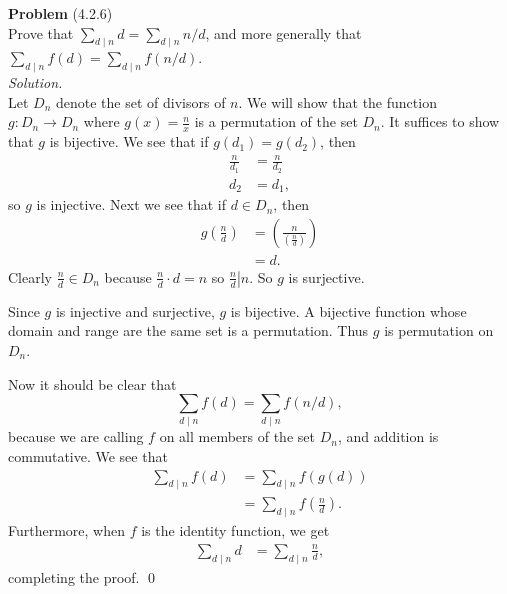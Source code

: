 \documentclass[12 pt]{amsart}
\begin{document}
\phantom{\quad} \vfill
\noindent
\textbf{Problem} (4.2.6) \\[4ex]
  Prove that $\sum_{d \mid n} d = \sum_{d \mid n} n / d$, 
  and more generally that 
  $\sum_{d \mid n} f(d) = \sum_{d \mid n} f(n / d)$.
  \\[2ex]
\emph{Solution.} \\[2ex]
  Let $D_n$ denote the set of divisors of $n$.
  We will show that the function 
  $g: D_n \to D_n$ where
  $g(x) = \frac{n}{x}$ is a permutation of the set $D_n$.
  It suffices to show that $g$ is bijective.
  We see that if $g(d_1) = g(d_2)$, then 
  \begin{align*}
    \frac{n}{d_1} &=  \frac{n}{d_2} \\
    d_2 &= d_1,
  \end{align*}
  so $g$ is injective.
  Next we see that if $d \in D_n$, 
  then 
  \begin{align*}
    g\left( \frac{n}{d} \right) 
    &=
    \left( \frac{n}{\left( \frac{n}{d} \right)} \right) \\
    &=
      d.
  \end{align*}
  Clearly $\frac{n}{d} \in D_n$ because
  $\frac{n}{d} \cdot d = n$ so 
  $\left. \frac{n}{d} \right| n$.
  So $g$ is surjective.

  Since $g$ is injective and surjective, $g$ is bijective.
  A bijective function whose domain and range are the same set
  is a permutation.
  Thus $g$ is permutation on $D_n$.

  Now it should be clear that 
  \[
    \sum_{d \mid n} f(d) = \sum_{d \mid n} f(n / d),
  \]
  because we are calling $f$ on all members of the set $D_n$, 
  and addition is commutative.
  We see that 
  \begin{align*}
    \sum_{d \mid n} f(d) &= \sum_{d \mid n} f(g(d)) \\
                         &= \sum_{d \mid n} f\left(\frac{n}{d}\right).
  \end{align*}
  Furthermore, when $f$ is the identity function, we get
  \begin{align*}
    \sum_{d \mid n} d &= \sum_{d \mid n} \frac{n}{d},
  \end{align*}
  completing the proof.
  \qed
\vfill
\newpage
\end{document}
